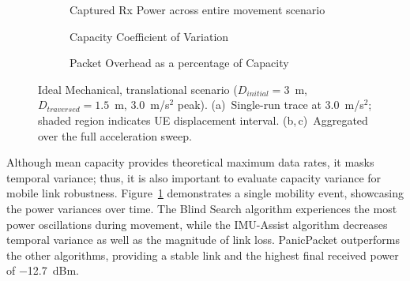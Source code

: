\documentclass[fleqn,10pt]{wlscirep}
\begin{document}
\begin{figure}[ht!]
    \centering
    \begin{subfigure}[t]{0.49\textwidth}
        \vspace{0pt} %
        \centering
        
        \vspace{-20pt}
        \caption{Captured Rx Power across entire movement scenario}
        \label{fig:trans_metrics_example}
    \end{subfigure}%
    \hfill
    \begin{minipage}[t]{0.49\textwidth}
        \vspace{0pt} %
        \centering
        \begin{subfigure}{\linewidth}
        
        \vspace{-20pt}
        \caption{Capacity Coefficient of Variation}
        \label{fig:trans_metrics_covariance}
        
    \end{subfigure}
    \vfill
        \begin{subfigure}{\linewidth}
        
        \vspace{-20pt}
        \caption{Packet Overhead as a percentage of Capacity}
        \label{fig:trans_metrics_overhead}
    \end{subfigure}
    \end{minipage}
    \caption{Ideal Mechanical, translational scenario ($D_{initial} = 3$~m, $D_{traversed} = 1.5$~m, $3.0$~m/s$^2$ peak). (a)~Single-run trace at $3.0$~m/s$^2$; shaded region indicates UE displacement interval. (b,\,c)~Aggregated over the full acceleration sweep.}
    \label{fig:translational_metrics}
    \vspace{-5pt}
\end{figure}

Although mean capacity provides theoretical maximum data rates, it masks temporal variance; thus, it is also important to evaluate capacity variance for mobile link robustness. Figure~\ref{fig:trans_metrics_example} demonstrates a single mobility event, showcasing the power variances over time. The Blind Search algorithm experiences the most power oscillations during movement, while the IMU-Assist algorithm decreases temporal variance as well as the magnitude of link loss. PanicPacket outperforms the other algorithms, providing a stable link and the highest final received power of \SI{-12.7}{dBm}.
\end{document}
